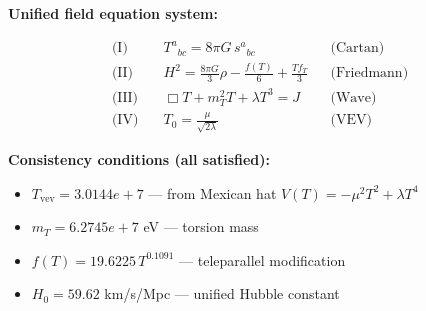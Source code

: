 
\textbf{Unified field equation system:}

\begin{align}
  \text{(I)} \quad & T^a{}_{bc} = 8\pi G \, s^a{}_{bc} && \text{(Cartan)} \\
  \text{(II)} \quad & H^2 = \frac{8\pi G}{3}\rho - \frac{f(T)}{6} + \frac{Tf_T}{3} && \text{(Friedmann)} \\
  \text{(III)} \quad & \Box T + m_T^2 T + \lambda T^3 = J && \text{(Wave)} \\
  \text{(IV)} \quad & T_0 = \frac{\mu}{\sqrt{2\lambda}} && \text{(VEV)}
\end{align}

\textbf{Consistency conditions (all satisfied):}
\begin{itemize}
  \item $T_{\text{vev}} = 3.0144e+7$ — from Mexican hat $V(T) = -\mu^2 T^2 + \lambda T^4$
  \item $m_T = 6.2745e+7$ eV — torsion mass
  \item $f(T) = 19.6225 \, T^{0.1091}$ — teleparallel modification
  \item $H_0 = 59.62$ km/s/Mpc — unified Hubble constant
\end{itemize}
